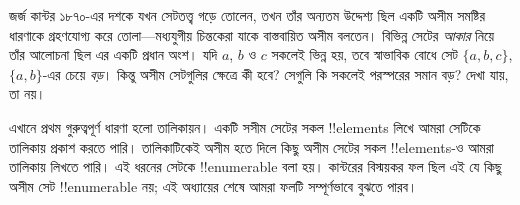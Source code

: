 \documentclass[../../../include/open-logic-section]{subfiles}
\begin{document}


জর্জ কান্টর ১৮৭০-এর দশকে যখন সেটতত্ত্ব গড়ে তোলেন, তখন তাঁর অন্যতম উদ্দেশ্য ছিল একটি অসীম সমষ্টির ধারণাকে গ্রহণযোগ্য করে তোলা—মধ্যযুগীয় চিন্তকেরা যাকে বাস্তবায়িত অসীম বলতেন। বিভিন্ন সেটের \emph{আকার} নিয়ে তাঁর আলোচনা ছিল এর একটি প্রধান অংশ। যদি $a$, $b$ ও $c$ সকলেই ভিন্ন হয়, তবে স্বাভাবিক বোধে সেট $\{a, b, c\}$, $\{a, b\}$-এর চেয়ে \emph{বড়}। কিন্তু অসীম সেটগুলির ক্ষেত্রে কী হবে? সেগুলি কি সকলেই পরস্পরের সমান বড়? দেখা যায়, তা নয়।

এখানে প্রথম গুরুত্বপূর্ণ ধারণা হলো তালিকায়ন। একটি সসীম সেটের সকল !!{element}s লিখে আমরা সেটিকে তালিকায় প্রকাশ করতে পারি। তালিকাটিকেই অসীম হতে দিলে কিছু অসীম সেটের সকল !!{element}s-ও আমরা তালিকায় লিখতে পারি। এই ধরনের সেটকে !!{enumerable} বলা হয়। কান্টরের বিস্ময়কর ফল ছিল এই যে কিছু অসীম সেট !!{enumerable} নয়; এই অধ্যায়ের শেষে আমরা ফলটি সম্পূর্ণভাবে বুঝতে পারব।
\end{document}
